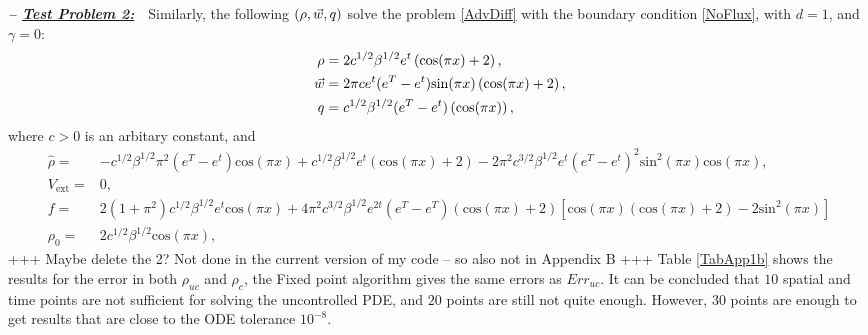 \textbf{\emph{-- \underline{Test Problem 2:}}}~~Similarly, the following $(\rho,\vec{w},q)$ solve the problem \eqref{AdvDiff} with the boundary condition \eqref{NoFlux}, with $d=1$, and $\gamma = 0$:
\begin{align*}
\ \rho={}&2c^{1/2}\beta^{1/2}e^{t}\left(\text{cos}(\pi{}x)+2\right), \\
\ \vec{w}={}&2\pi{}ce^{t}(e^{T}-e^{t})\text{sin}(\pi{}x)\left(\text{cos}(\pi{}x)+2\right), \\
\ \adj={}&c^{1/2}\beta^{1/2}(e^{T}-e^{t})\left(\text{cos}(\pi{}x)\right),
\end{align*}
where $c>0$ is an arbitary constant, and
\begin{align*}
\ \widehat{\rho}={}&-c^{1/2}\beta^{1/2}\pi^2{}\left(e^{T}-e^{t}\right)\text{cos}(\pi{}x) +c^{1/2}\beta^{1/2}e^{t}\left(\text{cos}(\pi{}x) +2\right) -2\pi^{2}c^{3/2}\beta^{1/2}e^{t}(e^{T}-e^{t})^2\text{sin}^2(\pi{}x)\text{cos}(\pi{}x), \\
\ V_{\text{ext}}={}&0, \\
\ f={}&2(1+\pi^2)c^{1/2}\beta^{1/2}e^{t}\text{cos}(\pi{}x)+4\pi^2c^{3/2}\beta^{1/2}e^{2t}(e^{T}-e^{T})\left(\text{cos}(\pi{}x) +2\right)\left[\text{cos}(\pi{}x)\left(\text{cos}(\pi{}x) +2\right)-2\text{sin}^2(\pi{}x)\right] \\
\ \rho_{0}={}&2c^{1/2}\beta^{1/2}\text{cos}(\pi{}x),
\end{align*}
+++ Maybe delete the 2? Not done in the current version of my code -- so also not in Appendix B +++ 
Table \ref{TabApp1b} shows the results for the error in both $\rho_{uc}$ and $\rho_{c}$, the Fixed point algorithm gives the same errors as $Err_{uc}$. It can be concluded that $10$ spatial and time points are not sufficient for solving the uncontrolled PDE, and $20$ points are still not quite enough. However, $30$ points are enough to get results that are close to the ODE tolerance $10^{-8}$. 
